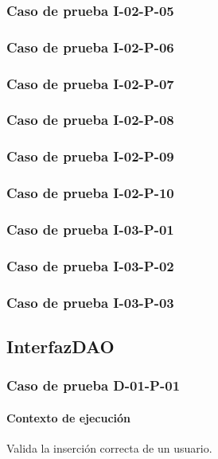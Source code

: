 \documentclass[10pt,a4paper]{article}
\begin{document}
			\subsubsection{Caso de prueba I-02-P-05}

			\subsubsection{Caso de prueba I-02-P-06}

			\subsubsection{Caso de prueba I-02-P-07}

			\subsubsection{Caso de prueba I-02-P-08}

			\subsubsection{Caso de prueba I-02-P-09}

			\subsubsection{Caso de prueba I-02-P-10}

			\subsubsection{Caso de prueba I-03-P-01}

			\subsubsection{Caso de prueba I-03-P-02}

			\subsubsection{Caso de prueba I-03-P-03}

	\subsection{InterfazDAO}
			\subsubsection{Caso de prueba D-01-P-01}
				\paragraph{Contexto de ejecución} Valida la inserción correcta de un usuario.
\end{document}
